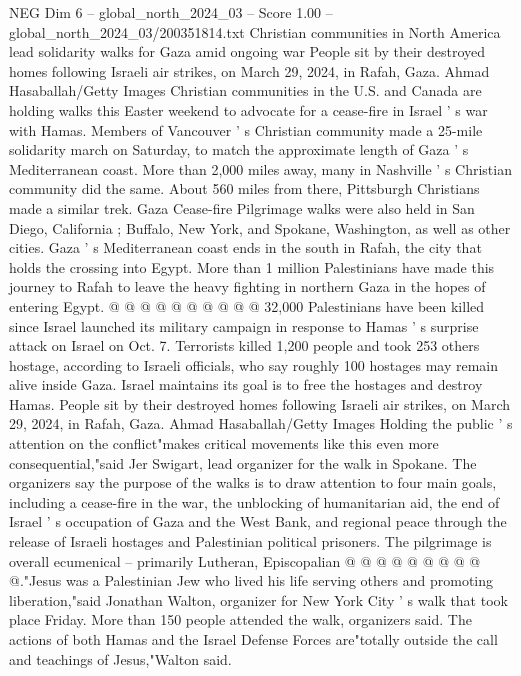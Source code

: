 \begin{textsample}{NEG Dim 6 – global\_north\_2024\_03 – Score 1.00 – global\_north\_2024\_03/200351814.txt}  \label{ex:f6_neg_399}
Christian communities in North America lead solidarity walks for Gaza amid ongoing war People sit by their destroyed homes following Israeli air strikes, on March 29, 2024, in Rafah, Gaza.
Ahmad Hasaballah/Getty Images Christian communities in the U.S. and Canada are holding walks this Easter weekend to advocate for a cease-fire in Israel ' s war with Hamas.
Members of Vancouver ' s Christian community made a 25-mile solidarity march on Saturday, to match the approximate length of Gaza ' s Mediterranean coast.
More than 2,000 miles away, many in Nashville ' s Christian community did the same.
About 560 miles from there, Pittsburgh Christians made a similar trek.
Gaza Cease-fire Pilgrimage walks were also held in San Diego, California ; Buffalo, New York, and Spokane, Washington, as well as other cities.
Gaza ' s Mediterranean coast ends in the south in Rafah, the city that holds the crossing into Egypt.
More than 1 million Palestinians have made this journey to Rafah to leave the heavy fighting in northern Gaza in the hopes of entering Egypt. @ @ @ @ @ @ @ @ @ @ 32,000 Palestinians have been killed since Israel launched its military campaign in response to Hamas ' s surprise attack on Israel on Oct. 7.
Terrorists killed 1,200 people and took 253 others hostage, according to Israeli officials, who say roughly 100 hostages may remain alive inside Gaza.
Israel maintains its goal is to free the hostages and destroy Hamas.
People sit by their destroyed homes following Israeli air strikes, on March 29, 2024, in Rafah, Gaza.
Ahmad Hasaballah/Getty Images Holding the public ' s attention on the conflict"makes critical movements like this even more consequential,"said Jer Swigart, lead organizer for the walk in Spokane.
The organizers say the purpose of the walks is to draw attention to four main goals, including a cease-fire in the war, the unblocking of humanitarian aid, the end of Israel ' s occupation of Gaza and the West Bank, and regional peace through the release of Israeli hostages and Palestinian political prisoners.
The pilgrimage is overall ecumenical -- primarily Lutheran, Episcopalian @ @ @ @ @ @ @ @ @ @."Jesus was a Palestinian Jew who lived his life serving others and promoting liberation,"said Jonathan Walton, organizer for New York City ' s walk that took place Friday.
More than 150 people attended the walk, organizers said.
The actions of both Hamas and the Israel Defense Forces are"totally outside the call and teachings of Jesus,"Walton said.

\end{textsample}
